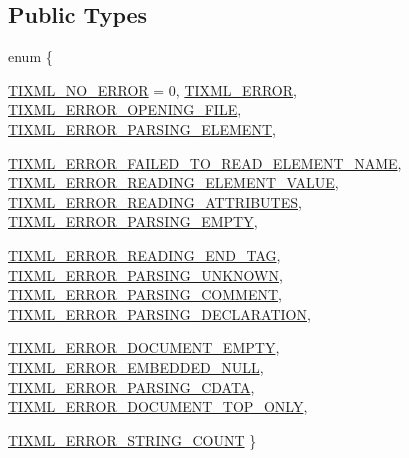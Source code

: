 \subsection*{Public Types}
\begin{DoxyCompactItemize}
\item 
enum \{ \par
\hyperlink{class_ti_xml_base_a53480a23da7c5737c9b1765d9b5c9461a750a76ca602241c416d5ec357d55fba1}{TIXML\_\-NO\_\-ERROR} =  0, 
\hyperlink{class_ti_xml_base_a53480a23da7c5737c9b1765d9b5c9461abcabc1b8efabeda1cc4352aa73d64390}{TIXML\_\-ERROR}, 
\hyperlink{class_ti_xml_base_a53480a23da7c5737c9b1765d9b5c9461ab803949b8f12e03b5b57f86d9c52b614}{TIXML\_\-ERROR\_\-OPENING\_\-FILE}, 
\hyperlink{class_ti_xml_base_a53480a23da7c5737c9b1765d9b5c9461a5cbfcf7fe5e67f0cd1aef98deac55dd2}{TIXML\_\-ERROR\_\-PARSING\_\-ELEMENT}, 
\par
\hyperlink{class_ti_xml_base_a53480a23da7c5737c9b1765d9b5c9461adcc31ca78a9d507a88c9fafb3d18a3c4}{TIXML\_\-ERROR\_\-FAILED\_\-TO\_\-READ\_\-ELEMENT\_\-NAME}, 
\hyperlink{class_ti_xml_base_a53480a23da7c5737c9b1765d9b5c9461afefdc75db23215e846605a2b5af0c2d3}{TIXML\_\-ERROR\_\-READING\_\-ELEMENT\_\-VALUE}, 
\hyperlink{class_ti_xml_base_a53480a23da7c5737c9b1765d9b5c9461a670fac23171b64829f90639cc3696d6e}{TIXML\_\-ERROR\_\-READING\_\-ATTRIBUTES}, 
\hyperlink{class_ti_xml_base_a53480a23da7c5737c9b1765d9b5c9461a5f2aee664733a20f13f6f77556b9fa85}{TIXML\_\-ERROR\_\-PARSING\_\-EMPTY}, 
\par
\hyperlink{class_ti_xml_base_a53480a23da7c5737c9b1765d9b5c9461a175f7c72e2f9630bb96ef5137b325502}{TIXML\_\-ERROR\_\-READING\_\-END\_\-TAG}, 
\hyperlink{class_ti_xml_base_a53480a23da7c5737c9b1765d9b5c9461a24c814fdcf1d84704869e6f76b19cb6e}{TIXML\_\-ERROR\_\-PARSING\_\-UNKNOWN}, 
\hyperlink{class_ti_xml_base_a53480a23da7c5737c9b1765d9b5c9461a72e3072a44be499edb89593f6ce10f6c}{TIXML\_\-ERROR\_\-PARSING\_\-COMMENT}, 
\hyperlink{class_ti_xml_base_a53480a23da7c5737c9b1765d9b5c9461a4c200f9d125027ab449e2be7be471ba0}{TIXML\_\-ERROR\_\-PARSING\_\-DECLARATION}, 
\par
\hyperlink{class_ti_xml_base_a53480a23da7c5737c9b1765d9b5c9461ab345f3e42e6ae9cdedee2b95e4d461b9}{TIXML\_\-ERROR\_\-DOCUMENT\_\-EMPTY}, 
\hyperlink{class_ti_xml_base_a53480a23da7c5737c9b1765d9b5c9461ade7edbad3a94a6c161cac2638f380e17}{TIXML\_\-ERROR\_\-EMBEDDED\_\-NULL}, 
\hyperlink{class_ti_xml_base_a53480a23da7c5737c9b1765d9b5c9461aab2c858631b5d38eae1e6675949b9cd4}{TIXML\_\-ERROR\_\-PARSING\_\-CDATA}, 
\hyperlink{class_ti_xml_base_a53480a23da7c5737c9b1765d9b5c9461a679b15d950f29257700a724bb118c34d}{TIXML\_\-ERROR\_\-DOCUMENT\_\-TOP\_\-ONLY}, 
\par
\hyperlink{class_ti_xml_base_a53480a23da7c5737c9b1765d9b5c9461a14552894942250efcec6b00dc52fc48a}{TIXML\_\-ERROR\_\-STRING\_\-COUNT}
 \}
\end{DoxyCompactItemize}
